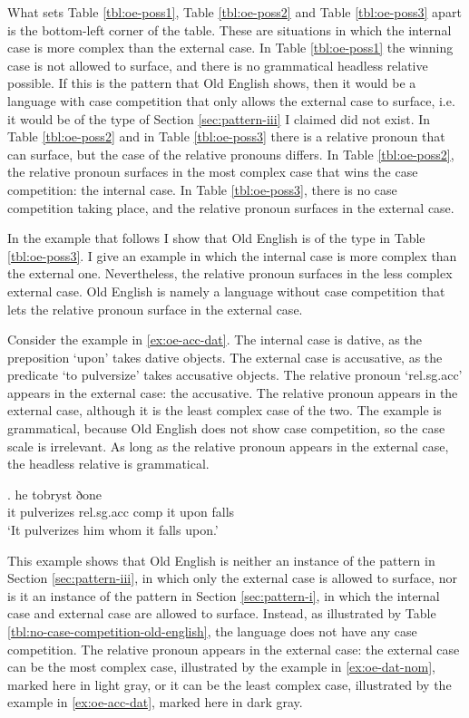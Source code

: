 What sets Table \ref{tbl:oe-poss1}, Table \ref{tbl:oe-poss2} and Table \ref{tbl:oe-poss3} apart is the bottom-left corner of the table. These are situations in which the internal case is more complex than the external case.
In Table \ref{tbl:oe-poss1} the winning case is not allowed to surface, and there is no grammatical headless relative possible. If this is the pattern that Old English shows, then it would be a language with case competition that only allows the external case to surface, i.e. it would be of the type of Section \ref{sec:pattern-iii} I claimed did not exist.
In Table \ref{tbl:oe-poss2} and in Table \ref{tbl:oe-poss3} there is a relative pronoun that can surface, but the case of the relative pronouns differs. In Table \ref{tbl:oe-poss2}, the relative pronoun surfaces in the most complex case that wins the case competition: the internal case. In Table \ref{tbl:oe-poss3}, there is no case competition taking place, and the relative pronoun surfaces in the external case.

In the example that follows I show that Old English is of the type in Table \ref{tbl:oe-poss3}. I give an example in which the internal case is more complex than the external one. Nevertheless, the relative pronoun surfaces in the less complex external case. Old English is namely a language without case competition that lets the relative pronoun surface in the external case.

Consider the example in \ref{ex:oe-acc-dat}.
The internal case is dative, as the preposition  `upon' takes dative objects.
The external case is accusative, as the predicate  `to pulversize' takes accusative objects.
The relative pronoun  `\ac{rel}.\ac{sg}.\ac{acc}' appears in the external case: the accusative.
The relative pronoun appears in the external case, although it is the least complex case of the two. The example is grammatical, because Old English does not show case competition, so the case scale is irrelevant. As long as the relative pronoun appears in the external case, the headless relative is grammatical.

\exg. he tobryst ðone    \\
 it pulverizes\scsub{[acc]} \ac{rel}.\ac{sg}.\ac{acc} \ac{comp} it upon\scsub{[dat]} falls\\
`It pulverizes him whom it falls upon.'  \label{ex:oe-acc-dat}

This example shows that Old English is neither an instance of the pattern in Section \ref{sec:pattern-iii}, in which only the external case is allowed to surface, nor is it an instance of the pattern in Section \ref{sec:pattern-i}, in which the internal case and external case are allowed to surface.
Instead, as illustrated by Table \ref{tbl:no-case-competition-old-english}, the language does not have any case competition. The relative pronoun appears in the external case: the external case can be the most complex case, illustrated by the example in \ref{ex:oe-dat-nom}, marked here in light gray, or it can be the least complex case, illustrated by the example in \ref{ex:oe-acc-dat}, marked here in dark gray.

